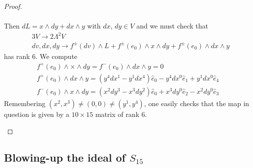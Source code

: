 \begin{proof}
\begin{itemize}
\begin{align*}
\end{align*}
Then $dL=x\wedge dy+dx\wedge y$ with $dx$, $dy\in V$ and we must check
that
\begin{align*}
& 3V\to 2\Lambda^{2}V\\
& dv,dx,dy\to f^{\pm}(dv)\wedge L+f^{\pm}(e_{0})\wedge x\wedge
dy+f^{\pm}(e_{0})\wedge dx\wedge y
\end{align*}
has rank 6. We compute
\begin{gather*}
f^{+}(e_{0})\wedge \times \wedge dy=f^{-}(e_{0})\wedge dx\wedge
y=0\\[4pt]
f^{+}(e_{0})\wedge dx\wedge
y=(y^{4}dx^{1}-y^{1}dx^{4})\widehat{e}_{0}-y^{4}dx^{0}\widehat{e}_{1}+y^{1}dx^{0}\widehat{e}_{4}\\[4pt]
f^{-}(e_{0})\wedge x\wedge
dy=(x^{2}dy^{3}-x^{3}dy^{2})\widehat{e}_{0}+x^{3}dy^{0}\widehat{e}_{2}-x^{2}dy^{0}\widehat{e}_{3} 
\end{gather*}
Remembering $(x^{2},x^{3})\neq (0,0)\neq (y^{1},y^{4})$, one easily
checks that the map in question is given by a $10\times 15$ matrix of
rank $6$. 
\end{itemize}
\end{proof}

\subsection{Blowing-up the ideal of \texorpdfstring{$S_{15}$}{S15}}\pageoriginale\label{chap2-sec5.4}


